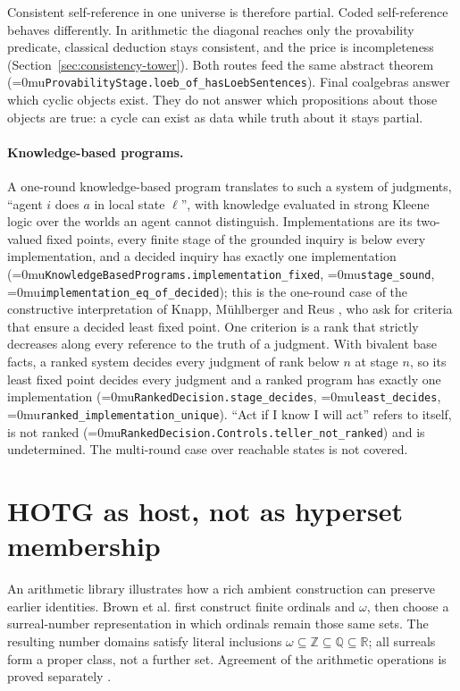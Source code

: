 \documentclass[11pt]{article}
\newcommand{\leanname}[1]{\textup{\Urlmuskip=0mu\relax\nolinkurl{#1}}}
\theoremstyle{definition}
\theoremstyle{remark}
\begin{document}
Consistent self-reference in one universe is therefore partial.  Coded
self-reference behaves differently.  In arithmetic the diagonal reaches only the
provability predicate, classical deduction stays consistent, and the price is
incompleteness (Section~\ref{sec:consistency-tower}).  Both routes feed the same
abstract theorem (\leanname{ProvabilityStage.loeb_of_hasLoebSentences}).
Final coalgebras answer which cyclic objects exist.  They do not answer which
propositions about those objects are true: a cycle can exist as data while truth
about it stays partial.

\paragraph{Knowledge-based programs.}
A one-round knowledge-based program translates to such a system of judgments,
``agent $i$ does $a$ in local state $\ell$'', with knowledge evaluated in strong
Kleene logic over the worlds an agent cannot distinguish.  Implementations are
its two-valued fixed points, every finite stage of the grounded inquiry is
below every implementation, and a decided inquiry has exactly one
implementation (\leanname{KnowledgeBasedPrograms.implementation_fixed},
\leanname{stage_sound}, \leanname{implementation_eq_of_decided}); this is the
one-round case of the constructive interpretation of Knapp, M\"uhlberger and
Reus \cite{KnappMuehlbergerReusKBP}, who ask for criteria that ensure a decided
least fixed point.  One criterion is a rank that strictly decreases along every
reference to the truth of a judgment.  With bivalent base facts, a ranked
system decides every judgment of rank below $n$ at stage $n$, so its least
fixed point decides every judgment and a ranked program has exactly one
implementation (\leanname{RankedDecision.stage_decides},
\leanname{least_decides}, \leanname{ranked_implementation_unique}).  ``Act if I
know I will act'' refers to itself, is not ranked
(\leanname{RankedDecision.Controls.teller_not_ranked}) and is undetermined.  The
multi-round case over reachable states is not covered.

\section{HOTG as host, not as hyperset membership}

An arithmetic library illustrates how a rich ambient construction can preserve
earlier identities. Brown et al. first construct finite ordinals and $\omega$,
then choose a surreal-number representation in which ordinals remain those
same sets. The resulting number domains satisfy literal inclusions
$\omega\subseteq\mathbb Z\subseteq\mathbb Q\subseteq\mathbb R$; all surreals
form a proper class, not a further set. Agreement of the arithmetic operations
is proved separately \cite{BrownKaliszykSudaUrbanHammering}.
\end{document}
